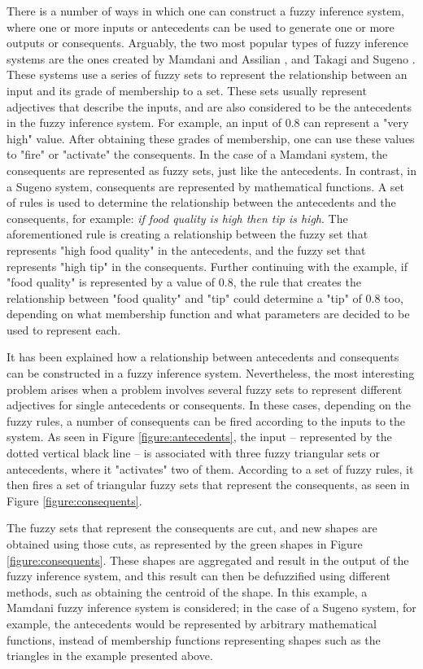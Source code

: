 There is a number of ways in which one can construct a fuzzy inference system,
where one or more inputs or antecedents can be used to generate one or more
outputs or consequents. Arguably, the two most popular types of fuzzy inference
systems are the ones created by Mamdani and Assilian \cite{Mamdani1975}, and
Takagi and Sugeno \cite{Takagi1985}. These systems use a series of fuzzy sets to
represent the relationship between an input and its grade of membership to a
set. These sets usually represent adjectives that describe the inputs, and are
also considered to be the antecedents in the fuzzy inference system. For
example, an input of 0.8 can represent a "very high" value. After obtaining
these grades of membership, one can use these values to "fire" or "activate" the
consequents. In the case of a Mamdani system, the consequents are represented as
fuzzy sets, just like the antecedents. In contrast, in a Sugeno system,
consequents are represented by mathematical functions. A set of rules is used to
determine the relationship between the antecedents and the consequents, for
example: \textit{if food quality is high then tip is high}. The aforementioned
rule is creating a relationship between the fuzzy set that represents "high food
quality" in the antecedents, and the fuzzy set that represents "high tip" in the
consequents. Further continuing with the example, if "food quality" is
represented by a value of 0.8, the rule that creates the relationship between
"food quality" and "tip" could determine a "tip" of 0.8 too, depending on what
membership function and what parameters are decided to be used to represent
each.

It has been explained how a relationship between antecedents and consequents can
be constructed in a fuzzy inference system. Nevertheless, the most interesting
problem arises when a problem involves several fuzzy sets to represent different
adjectives for single antecedents or consequents. In these cases, depending on
the fuzzy rules, a number of consequents can be fired according to the inputs to
the system. As seen in Figure \ref{figure:antecedents}, the input -- represented
by the dotted vertical black line -- is associated with three fuzzy triangular
sets or antecedents, where it "activates" two of them. According to a set of
fuzzy rules, it then fires a set of triangular fuzzy sets that represent the
consequents, as seen in Figure \ref{figure:consequents}.

The fuzzy sets that represent the consequents are cut, and new shapes are
obtained using those cuts, as represented by the green shapes in Figure
\ref{figure:consequents}. These shapes are aggregated and result in the output
of the fuzzy inference system, and this result can then be defuzzified using
different methods, such as obtaining the centroid of the shape. In this example,
a Mamdani fuzzy inference system is considered; in the case of a Sugeno system,
for example, the antecedents would be represented by arbitrary mathematical
functions, instead of membership functions representing shapes such as the
triangles in the example presented above.

